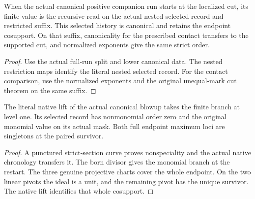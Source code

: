 \begin{theorem}
\label{hir:g1-localized-next-born-finite-read}
\leanok
When the actual canonical positive companion run starts at
the localized cut, its finite value is the recursive read
on the actual nested selected record and restricted suffix.
This selected history is canonical and retains the
endpoint cosupport. On that suffix, canonicality for
the prescribed contact transfers to the supported cut,
and normalized exponents give the same strict order.
\end{theorem}
\begin{proof}
Use the actual full-run split and lower canonical data.
The nested restriction maps identify the literal nested
selected record. For the contact comparison, use the
normalized exponents and the original unequal-mark cut
theorem on the same suffix.
\end{proof}

\begin{theorem}
\label{hir:g1-advanced-head-native-monomial-maxima}
\leanok
The literal native lift of the actual canonical blowup
takes the finite branch at level one. Its selected
record has nonmonomial order zero and the original
monomial value on its actual mask. Both full endpoint
maximum loci are singletons at the paired survivor.
\end{theorem}
\begin{proof}
A punctured strict-section curve proves nonspeciality
and the actual native chronology transfers it.
The born divisor gives the monomial branch at the
restart. The three genuine projective charts cover the
whole endpoint. On the two linear pivots the ideal is
a unit, and the remaining pivot has the unique survivor.
The native lift identifies that whole cosupport.
\end{proof}

